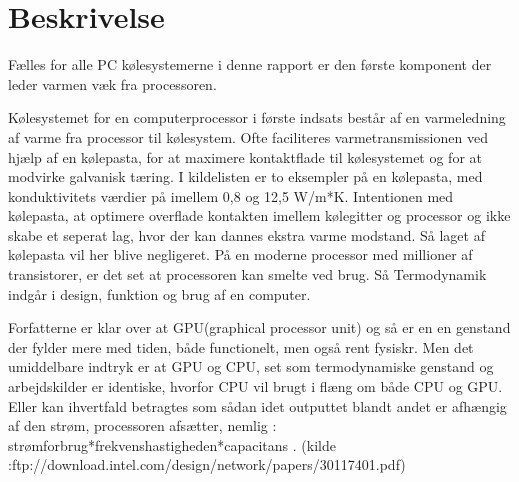 \section{Beskrivelse}

Fælles for alle PC kølesystemerne i denne rapport er den første komponent der leder varmen væk fra processoren.

Kølesystemet for en computerprocessor i første indsats består af en varmeledning af varme fra processor til kølesystem.
Ofte faciliteres varmetransmissionen ved hjælp af en kølepasta, for at maximere kontaktflade til kølesystemet og for at modvirke galvanisk tæring.
I kildelisten er to eksempler på en kølepasta, med konduktivitets værdier på imellem 0,8 og 12,5 W/m*K.
Intentionen med kølepasta, at optimere overflade kontakten imellem kølegitter og processor og ikke skabe et seperat lag, hvor der kan dannes ekstra varme modstand. Så laget af kølepasta vil her blive negligeret. På en moderne processor med millioner af transistorer, er det set at processoren kan smelte ved brug. Så Termodynamik indgår i design, funktion og brug af en computer.

Forfatterne er klar over at GPU(graphical processor unit) og så er en en genstand der fylder mere med tiden, både functionelt, men også rent fysiskr.  
Men det umiddelbare indtryk er at GPU og CPU, set som termodynamiske genstand og arbejdskilder er identiske, hvorfor CPU vil brugt i flæng om både CPU og GPU.
Eller kan ihvertfald betragtes som sådan idet outputtet blandt andet er afhængig af den strøm, processoren afsætter, nemlig :
 strømforbrug*frekvenshastigheden*capacitans .
 (kilde :ftp://download.intel.com/design/network/papers/30117401.pdf)

